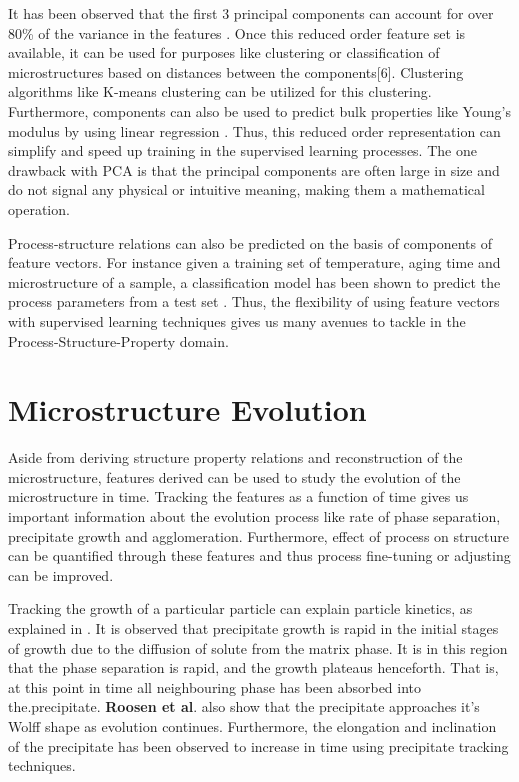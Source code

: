 \documentclass[12pt, a4paper]{report}
\begin{document}
It has been observed that the first 3 principal components can account for over 80\% of the variance in the features \cite{9paulson2017reduced}. Once this reduced order feature set is available, it can be used for purposes like clustering or classification of microstructures based on distances between the components[6]. Clustering algorithms like K-means clustering can be utilized for this clustering. Furthermore, components can also be used to predict bulk properties like Young's modulus by using linear regression \cite{9paulson2017reduced}. Thus, this reduced order representation can simplify and speed up training in the supervised learning processes. The one drawback with PCA is that the principal components are often large in size and do not signal any physical or intuitive meaning, making them a mathematical operation.

Process-structure relations can also be predicted on the basis of components of feature vectors. For instance given a training set of temperature, aging time and microstructure of a sample, a classification model has been shown to predict the process parameters from a test set \cite{2yabansu2019application}. Thus, the flexibility of using feature vectors with supervised learning techniques gives us many avenues to tackle in the Process-Structure-Property domain.

\section{Microstructure Evolution}

Aside from deriving structure property relations and reconstruction of the microstructure, features derived can be used to study the evolution of the microstructure in time. Tracking the features as a function of time gives us important information about the evolution process like rate of phase separation, precipitate growth and agglomeration. Furthermore, effect of process on structure can be quantified through these features and thus process fine-tuning or adjusting can be improved. 

Tracking the growth of a particular particle can explain particle kinetics, as explained in \cite{10roosen1998simulations}. It is observed that precipitate growth is rapid in the initial stages of growth due to the diffusion of solute from the matrix phase. It is in this region that the phase separation is rapid, and the growth plateaus henceforth. That is, at this point in time all neighbouring phase has been absorbed into the.precipitate. \textbf{Roosen et al}.\cite{10roosen1998simulations} also show that the precipitate approaches it's Wolff shape as evolution continues. Furthermore, the elongation and inclination of the precipitate has been observed to increase in time using precipitate tracking techniques. 
\end{document}
